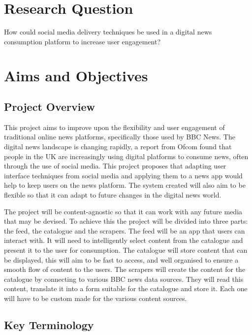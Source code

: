 \documentclass[12pt,titlepage]{article}
\begin{document}
\tableofcontents
\newpage

\section{Research Question}

How could social media delivery techniques be used in a digital news consumption platform to increase user engagement?

\section{Aims and Objectives}

  \subsection{Project Overview}

  This project aims to improve upon the flexibility and user engagement of
  traditional online news platforms, specifically those used by BBC News. The
  digital news landscape is changing rapidly, a report from Ofcom found that
  people in the UK are increasingly using digital platforms to consume news,
  often through the use of social media. This project proposes that adapting
  user interface techniques from social media and applying them to a news app
  would help to keep users on the news platform. The system created will also
  aim to be flexible so that it can adapt to future changes in the digital news
  world.

  The project will be content-agnostic so that it can work with any future media
  that may be devised. To achieve this the project will be divided into three
  parts: the feed, the catalogue and the scrapers. The feed will be an app that
  users can interact with. It will need to intelligently select content from the
  catalogue and present it to the user for consumption. The catalogue will store
  content that can be displayed, this will aim to be fast to access, and well
  organised to ensure a smooth flow of content to the users. The scrapers will
  create the content for the catalogue by connecting to various BBC news data
  sources. They will read this content, translate it into a form suitable for
  the catalogue and store it. Each one will have to be custom made for the
  various content sources.

  \subsection{Key Terminology}
\end{document}
